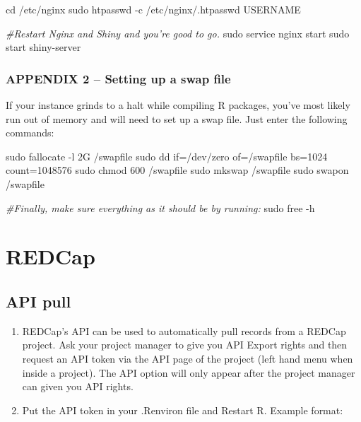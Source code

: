 \documentclass[
]{book}
\newenvironment{Shaded}{\begin{snugshade}}{\end{snugshade}}
\newcommand{\AttributeTok}[1]{\textcolor[rgb]{0.77,0.63,0.00}{#1}}
\newcommand{\BuiltInTok}[1]{#1}
\newcommand{\CommentTok}[1]{\textcolor[rgb]{0.56,0.35,0.01}{\textit{#1}}}
\newcommand{\FunctionTok}[1]{\textcolor[rgb]{0.00,0.00,0.00}{#1}}
\newcommand{\NormalTok}[1]{#1}
\begin{document}
\begin{Shaded}
\begin{Highlighting}[]

\BuiltInTok{cd}\NormalTok{ /etc/nginx}
\FunctionTok{sudo}\NormalTok{ htpasswd }\AttributeTok{{-}c}\NormalTok{ /etc/nginx/.htpasswd USERNAME}

\CommentTok{\#Restart Nginx and Shiny and you’re good to go.}
\FunctionTok{sudo}\NormalTok{ service nginx start}
\FunctionTok{sudo}\NormalTok{ start shiny{-}server}
\end{Highlighting}
\end{Shaded}

\hypertarget{appendix-2-setting-up-a-swap-file}{%
\subsection{APPENDIX 2 -- Setting up a swap file}\label{appendix-2-setting-up-a-swap-file}}

If your instance grinds to a halt while compiling R packages, you've most likely run out of memory and will need to set up a swap file. Just enter the following commands:

\begin{Shaded}
\begin{Highlighting}[]

\FunctionTok{sudo}\NormalTok{ fallocate }\AttributeTok{{-}l}\NormalTok{ 2G /swapfile}
\FunctionTok{sudo}\NormalTok{ dd if=/dev/zero of=/swapfile bs=1024 count=1048576}
\FunctionTok{sudo}\NormalTok{ chmod 600 /swapfile}
\FunctionTok{sudo}\NormalTok{ mkswap /swapfile}
\FunctionTok{sudo}\NormalTok{ swapon /swapfile}

\CommentTok{\#Finally, make sure everything as it should be by running:}
\FunctionTok{sudo}\NormalTok{ free }\AttributeTok{{-}h}
\end{Highlighting}
\end{Shaded}

\hypertarget{redcap}{%
\chapter{REDCap}\label{redcap}}

\hypertarget{api-pull}{%
\section{API pull}\label{api-pull}}

\begin{enumerate}
\def\labelenumi{\arabic{enumi}.}
\item
  REDCap's API can be used to automatically pull records from a REDCap project. Ask your project manager to give you API Export rights and then request an API token via the API page of the project (left hand menu when inside a project). The API option will only appear after the project manager can given you API rights.
\item
  Put the API token in your .Renviron file and Restart R. Example format:
\end{enumerate}
\end{document}
